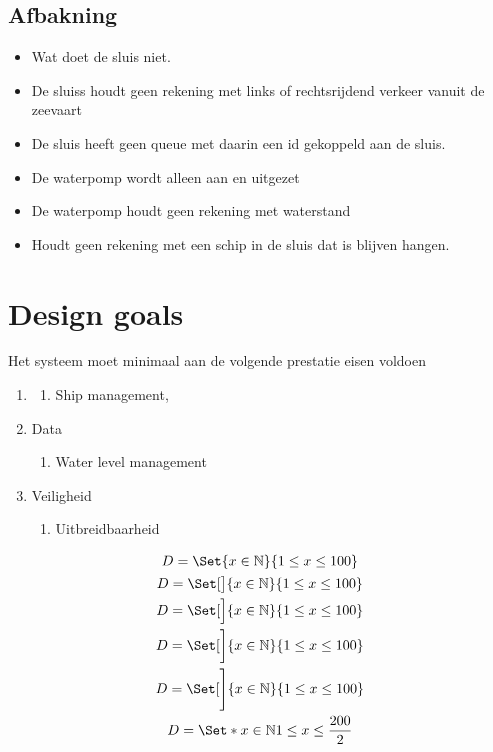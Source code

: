 \subsection{Afbakning}
\begin{itemize}
	\item Wat doet de sluis niet.
	\item De sluiss houdt geen rekening met links of rechtsrijdend verkeer vanuit de zeevaart
	\item De sluis heeft geen queue met daarin een id gekoppeld aan de sluis.
	\item De waterpomp wordt alleen aan en uitgezet
	\item De waterpomp houdt geen rekening met waterstand
	\item Houdt geen rekening met een schip in de sluis dat is blijven hangen.
	
\end{itemize}

\section{Design goals}
Het systeem moet minimaal aan de volgende prestatie eisen voldoen 

\begin{enumerate}
	\item  
	\begin{enumerate}
		\item Ship management,  
	\end{enumerate}
	\item Data
	\begin{enumerate}
		\item Water level management
	\end{enumerate}
	\item Veiligheid     
	\begin{enumerate}
		\item Uitbreidbaarheid     
	\end{enumerate}
	
	
\end{enumerate}


\begin{center}
	\begin{gather*}
		D=\Set{x\in\nat}{1\le x\le 100}\\
		D=\Set[\big]{x\in\nat}{1\le x\le 100}\\
		D=\Set[\Big]{x\in\nat}{1\le x\le 100}\\
		D=\Set[\bigg]{x\in\nat}{1\le x\le 100}\\
		D=\Set[\Bigg]{x\in\nat}{1\le x\le 100}\\
		D=\Set*{x\in\nat}{1\le x\le \frac{200}{2}}
	\end{gather*}
\end{center}





